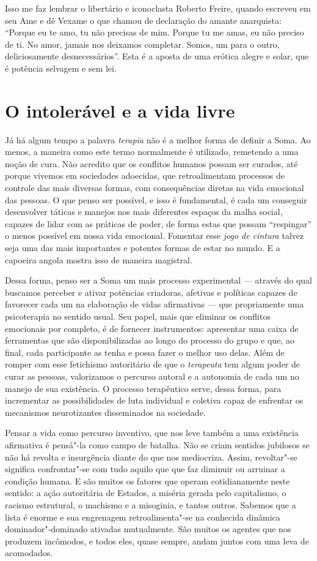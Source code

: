 Isso me faz lembrar o libertário e iconoclasta Roberto Freire, quando
escreveu em seu Ame e dê Vexame o que chamou de declaração do amante
anarquista: ``Porque eu te amo, tu não precisas de mim. Porque tu me
amas, eu não preciso de ti. No amor, jamais nos deixamos completar.
Somos, um para o outro, deliciosamente desnecessários''. Esta é a aposta
de uma erótica alegre e solar, que é potência selvagem e sem lei.

\section{O intolerável e a vida livre}

Já há algum tempo a palavra \emph{terapia} não é a melhor forma de
definir a Soma. Ao menos, a maneira como este termo normalmente é
utilizado, remetendo a uma noção de cura. Não acredito que os conflitos
humanos possam ser curados, até porque vivemos em sociedades adoecidas,
que retroalimentam processos de controle das mais diversas formas, com
consequências diretas na vida emocional das pessoas. O que penso ser
possível, e isso é fundamental, é cada um conseguir desenvolver táticas
e manejos nos mais diferentes espaços da malha social, capazes de lidar
com as práticas de poder, de forma estas que possam ``respingar'' o
menos possível em nossa vida emocional. Fomentar esse \emph{jogo de
cintura} talvez seja uma das mais importantes e potentes formas de estar
no mundo. E a capoeira angola mostra isso de maneira magistral.

Dessa forma, penso ser a Soma um mais processo experimental --- através do
qual buscamos perceber e ativar potências criadoras, afetivas e
políticas capazes de favorecer cada um na elaboração de vidas
afirmativas --- que propriamente uma psicoterapia no sentido usual. Seu
papel, mais que eliminar os conflitos emocionais por completo, é de
fornecer instrumentos: apresentar uma caixa de ferramentas que são
disponibilizadas ao longo do processo do grupo e que, ao final, cada
participante as tenha e possa fazer o melhor uso delas. Além de romper
com esse fetichismo autoritário de que o \emph{terapeuta} tem algum
poder de curar as pessoas, valorizamos o percurso autoral e a autonomia
de cada um no manejo de sua existência. O processo terapêutico serve,
dessa forma, para incrementar as possibilidades de luta individual e
coletiva capaz de enfrentar os mecanismos neurotizantes disseminados na
sociedade.

Pensar a vida como percurso inventivo, que nos leve também a uma
existência afirmativa é pensá"-la como campo de batalha. Não se criam
sentidos jubilosos se não há revolta e insurgência diante do que nos
mediocriza. Assim, revoltar"-se significa confrontar"-se com tudo aquilo
que que faz diminuir ou arruinar a condição humana. E são muitos os
fatores que operam cotidianamente neste sentido: a ação autoritária de
Estados, a miséria gerada pelo capitalismo, o racismo estrutural, o
machismo e a misoginia, e tantos outros. Sabemos que a lista é enorme e
sua engrenagem retroalimenta"-se na conhecida dinâmica dominador"-dominado
ativadas mutualmente. São muitos os agentes que nos produzem incômodos,
e todos eles, quase sempre, andam juntos com uma leva de acomodados.

